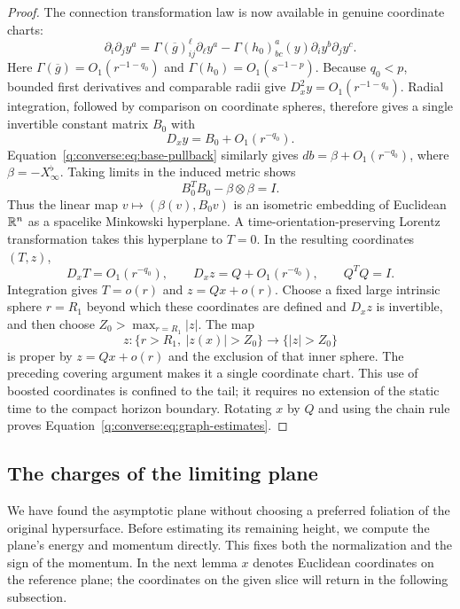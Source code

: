 \begin{proof}
The connection transformation law is now available in genuine
coordinate charts:
\begin{equation}
 \partial_i\partial_jy^a
 =\Gamma(\overline g)^\ell_{ij}\partial_\ell y^a
  -\Gamma(h_0)^a_{bc}(y)\partial_i y^b\partial_j y^c.
 \label{q:converse:eq:coordinate-connection}
\end{equation}
Here $\Gamma(\overline g)=O_1(r^{-1-q_0})$ and
$\Gamma(h_0)=O_1(s^{-1-p})$.  Because $q_0<p$, bounded first
derivatives and comparable radii give
$D_x^2y=O_1(r^{-1-q_0})$.
Radial integration, followed by comparison on coordinate spheres,
therefore gives a single invertible constant matrix $B_0$ with
\[
 D_xy=B_0+O_1(r^{-q_0}).
\]
Equation~\eqref{q:converse:eq:base-pullback} similarly gives
$db=\beta+O_1(r^{-q_0})$, where
$\beta=-X_\infty^\flat$.  Taking limits in the induced metric shows
\begin{equation}
 B_0^TB_0-\beta\otimes\beta=I.
 \label{q:converse:eq:limiting-plane}
\end{equation}
Thus the linear map $v\mapsto(\beta(v),B_0v)$ is an isometric
embedding of Euclidean $\mathbb R^n$ as a spacelike Minkowski hyperplane.
A time-orientation-preserving Lorentz transformation takes this
hyperplane to $T=0$.  In the resulting coordinates $(T,z)$,
\[
 D_xT=O_1(r^{-q_0}),\qquad D_xz=Q+O_1(r^{-q_0}),\qquad Q^TQ=I.
\]
Integration gives $T=o(r)$ and $z=Qx+o(r)$.  Choose a fixed large
intrinsic sphere $r=R_1$ beyond which these coordinates are defined
and $D_xz$ is invertible, and then choose
$Z_0>\max_{r=R_1}|z|$.  The map
\[
 z:\{r>R_1,\ |z(x)|>Z_0\}\longrightarrow\{|z|>Z_0\}
\]
is proper by $z=Qx+o(r)$ and the exclusion of that inner sphere.
The preceding covering argument makes it a single coordinate chart.
This use of boosted coordinates is confined to the tail; it requires
no extension of the static time to the compact horizon boundary.
Rotating $x$ by $Q$ and using the chain rule proves
Equation~\eqref{q:converse:eq:graph-estimates}.
\end{proof}

\subsection{The charges of the limiting plane}

We have found the asymptotic plane without choosing a preferred
foliation of the original hypersurface.  Before estimating its
remaining height, we compute the plane's energy and momentum directly.
This fixes both the normalization and the sign of the momentum.
In the next lemma $x$ denotes Euclidean coordinates on the reference
plane; the coordinates on the given slice will return in the following
subsection.

